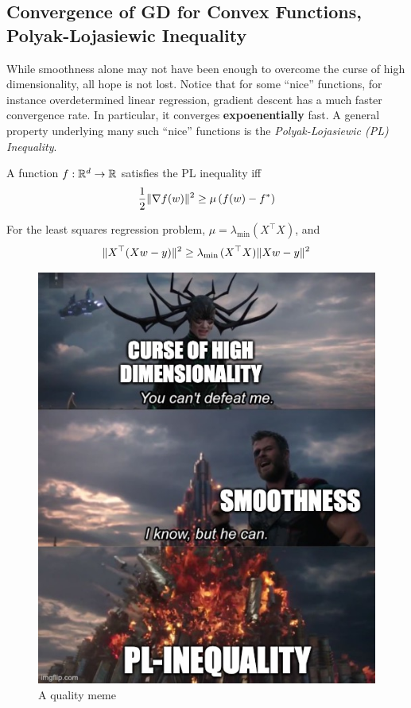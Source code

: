 \subsection{Convergence of GD for Convex Functions, Polyak-Lojasiewic Inequality}
While smoothness alone may not have been enough to overcome the curse of high dimensionality, all hope is not lost. Notice that for some ``nice'' functions, for instance overdetermined linear regression, gradient descent has a much faster convergence rate. In particular, it converges {\bf expoenentially} fast. A general property underlying many such ``nice'' functions is the {\em Polyak-Lojasiewic (PL) Inequality}.
\begin{defn}
\label{gd:defn:pl}
A function $f: \mathbb{R}^d \to \mathbb{R}$ satisfies the PL inequality iff
\begin{align*}
    \frac{1}{2} \lVert \nabla f(w) \rVert^2 \geq \mu \left( f(w) - f^* \right)
\end{align*}
\end{defn}
\begin{example}
For the least squares regression problem, $\mu = \lambda_{\min{}}(X^\top X)$, and
\begin{align*}
    \lVert X^\top (Xw - y) \rVert^2 \geq \lambda_{\min{}}(X^\top X)\lVert Xw - y \rVert^2
\end{align*}
\end{example}
\begin{figure}
    \centering
    \includegraphics[scale=0.4]{50wuxh.jpg}
    \caption{A quality meme}
\end{figure}
